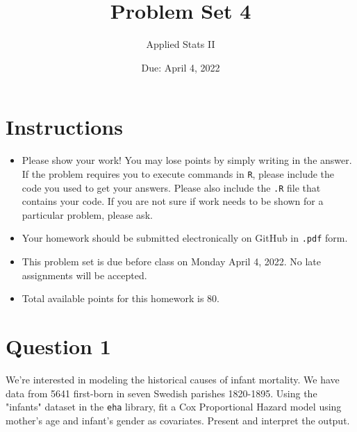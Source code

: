 \documentclass[12pt,letterpaper]{article}
\title{Problem Set 4}
\date{Due: April 4, 2022}
\author{Applied Stats II}
\begin{document}
	\maketitle
	\section*{Instructions}
	\begin{itemize}
		\item Please show your work! You may lose points by simply writing in the answer. If the problem requires you to execute commands in \texttt{R}, please include the code you used to get your answers. Please also include the \texttt{.R} file that contains your code. If you are not sure if work needs to be shown for a particular problem, please ask.
		\item Your homework should be submitted electronically on GitHub in \texttt{.pdf} form.
		\item This problem set is due before class on Monday April 4, 2022. No late assignments will be accepted.
		\item Total available points for this homework is 80.
	\end{itemize}

	\vspace{.25cm}
\section*{Question 1}
\vspace{.25cm}
\noindent We're interested in modeling the historical causes of infant mortality. We have data from 5641 first-born in seven Swedish parishes 1820-1895. Using the "infants" dataset in the \texttt{eha} library, fit a Cox Proportional Hazard model using mother's age and infant's gender as covariates. Present and interpret the output.
\end{document}
